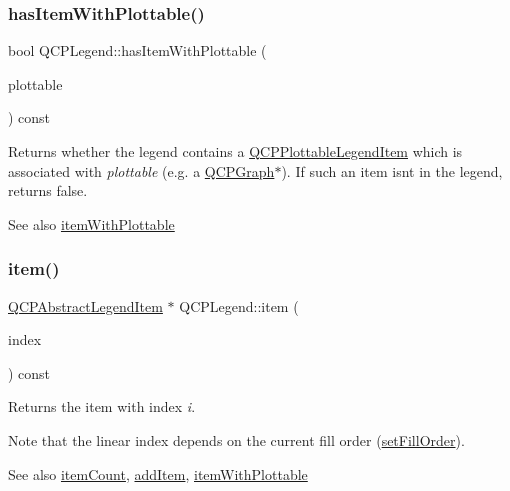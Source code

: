 \subsubsection{\texorpdfstring{has\+Item\+With\+Plottable()}{hasItemWithPlottable()}}
{\footnotesize\ttfamily bool Q\+C\+P\+Legend\+::has\+Item\+With\+Plottable (\begin{DoxyParamCaption}\item[{const \hyperlink{class_q_c_p_abstract_plottable}{Q\+C\+P\+Abstract\+Plottable} $\ast$}]{plottable }\end{DoxyParamCaption}) const}

Returns whether the legend contains a \hyperlink{class_q_c_p_plottable_legend_item}{Q\+C\+P\+Plottable\+Legend\+Item} which is associated with {\itshape plottable} (e.\+g. a \hyperlink{class_q_c_p_graph}{Q\+C\+P\+Graph}$\ast$). If such an item isn\textquotesingle{}t in the legend, returns false.

\begin{DoxySeeAlso}{See also}
\hyperlink{class_q_c_p_legend_a91e790002d8bf15a20628a8e8841e397}{item\+With\+Plottable} 
\end{DoxySeeAlso}
\mbox{\label{class_q_c_p_legend_acfe9694c45104a3359d3806ed366fcf7}} 
\subsubsection{\texorpdfstring{item()}{item()}}
{\footnotesize\ttfamily \hyperlink{class_q_c_p_abstract_legend_item}{Q\+C\+P\+Abstract\+Legend\+Item} $\ast$ Q\+C\+P\+Legend\+::item (\begin{DoxyParamCaption}\item[{int}]{index }\end{DoxyParamCaption}) const}

Returns the item with index {\itshape i}.

Note that the linear index depends on the current fill order (\hyperlink{class_q_c_p_layout_grid_affc2f3cfd22f28698c5b29b960d2a391}{set\+Fill\+Order}).

\begin{DoxySeeAlso}{See also}
\hyperlink{class_q_c_p_legend_a57ab86ab8b2a3762d4c1455eb5452c88}{item\+Count}, \hyperlink{class_q_c_p_legend_a3ab274de52d2951faea45a6d975e6b3f}{add\+Item}, \hyperlink{class_q_c_p_legend_a91e790002d8bf15a20628a8e8841e397}{item\+With\+Plottable} 
\end{DoxySeeAlso}
\mbox{\label{class_q_c_p_legend_a57ab86ab8b2a3762d4c1455eb5452c88}} 

